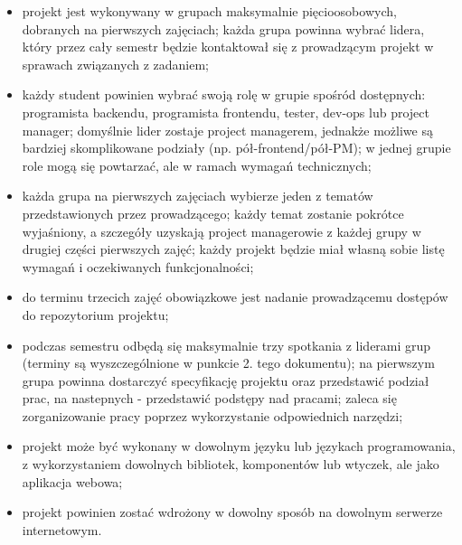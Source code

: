 \documentclass{article}
\begin{document}
	\begin{itemize}
		\item projekt jest wykonywany w grupach maksymalnie pięcioosobowych, dobranych na pierwszych zajęciach; każda grupa powinna wybrać lidera, który przez cały semestr będzie kontaktował się z prowadzącym projekt w sprawach związanych z zadaniem;
		\item każdy student powinien wybrać swoją rolę w grupie spośród dostępnych: programista backendu, programista frontendu, tester, dev-ops lub project manager; domyślnie lider zostaje project managerem, jednakże możliwe są bardziej skomplikowane podziały (np. pół-frontend/pół-PM); w jednej grupie role mogą się powtarzać, ale w ramach wymagań technicznych;
		\item każda grupa na pierwszych zajęciach wybierze jeden z tematów przedstawionych przez prowadzącego; każdy temat zostanie pokrótce wyjaśniony, a szczegóły uzyskają project managerowie z każdej grupy w drugiej części pierwszych zajęć; każdy projekt będzie miał własną sobie listę wymagań i oczekiwanych funkcjonalności;
		\item do terminu trzecich zajęć obowiązkowe jest nadanie prowadzącemu dostępów do repozytorium projektu;
		\item podczas semestru odbędą się maksymalnie trzy spotkania z liderami grup (terminy są wyszczególnione w punkcie 2. tego dokumentu); na pierwszym grupa powinna dostarczyć specyfikację projektu oraz przedstawić podział prac, na nastepnych - przedstawić podstępy nad pracami; zaleca się zorganizowanie pracy poprzez wykorzystanie odpowiednich narzędzi;
		\item projekt może być wykonany w dowolnym języku lub językach programowania, z wykorzystaniem dowolnych bibliotek, komponentów lub wtyczek, ale jako aplikacja webowa;
		\item projekt powinien zostać wdrożony w dowolny sposób na dowolnym serwerze internetowym.
	\end{itemize}
	
\end{document}
